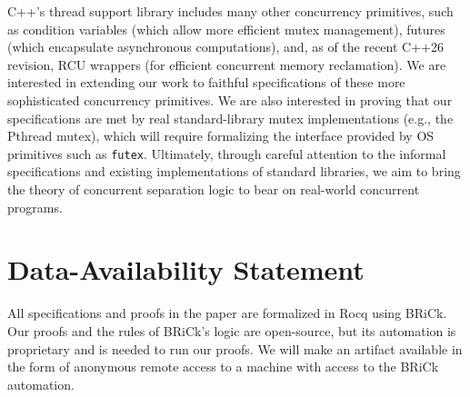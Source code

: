 \documentclass[acmsmall,screen,review,anonymous]{acmart}
\begin{document}
C++'s thread support library includes many other concurrency primitives, such as condition variables (which allow more efficient mutex management), futures (which encapsulate asynchronous computations), and, as of the recent C++26 revision, RCU wrappers (for efficient concurrent memory reclamation). We are interested in extending our work to faithful specifications of these more sophisticated concurrency primitives. We are also interested in proving that our specifications are met by real standard-library mutex implementations (e.g., the Pthread mutex), which will require formalizing the interface provided by OS primitives such as \lstinline{futex}. %
Ultimately, through careful attention to the informal specifications and existing implementations of standard libraries, we aim to bring the theory of concurrent separation logic to bear on real-world concurrent programs.

\section{Data-Availability Statement}
All specifications and proofs in the paper are formalized in Rocq using BRiCk. Our proofs and the rules of BRiCk's logic are open-source, but its automation is proprietary and is needed to run our proofs. We will make an artifact available in the form of anonymous remote access to a machine with access to the BRiCk automation.

\begin{acks}

\end{acks}



\end{document}
